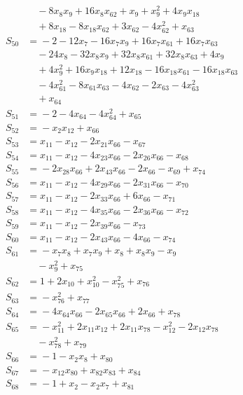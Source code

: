 \begin{align*}
&\quad{} -8x_{8}x_{9} +16x_{8}x_{62} +x_{9} +x_{9}^{2} +4x_{9}x_{18} \\
&\quad{} +8x_{18} -8x_{18}x_{62} +3x_{62} -4x_{62}^{2} +x_{63} \\
S_{50} &={} -2 -12x_{7} -16x_{7}x_{9} +16x_{7}x_{61} +16x_{7}x_{63} \\
&\quad{} -24x_{8} -32x_{8}x_{9} +32x_{8}x_{61} +32x_{8}x_{63} +4x_{9} \\
&\quad{} +4x_{9}^{2} +16x_{9}x_{18} +12x_{18} -16x_{18}x_{61} -16x_{18}x_{63} \\
&\quad{} -4x_{61}^{2} -8x_{61}x_{63} -4x_{62} -2x_{63} -4x_{63}^{2} \\
&\quad{} +x_{64} \\
S_{51} &={} -2 -4x_{64} -4x_{64}^{2} +x_{65} \\
S_{52} &={} -x_{2}x_{12} +x_{66} \\
S_{53} &={} x_{11} -x_{12} -2x_{21}x_{66} -x_{67} \\
S_{54} &={} x_{11} -x_{12} -4x_{23}x_{66} -2x_{26}x_{66} -x_{68} \\
S_{55} &={} -2x_{28}x_{66} +2x_{43}x_{66} -2x_{66} -x_{69} +x_{74} \\
S_{56} &={} x_{11} -x_{12} -4x_{29}x_{66} -2x_{31}x_{66} -x_{70} \\
S_{57} &={} x_{11} -x_{12} -2x_{33}x_{66} +6x_{66} -x_{71} \\
S_{58} &={} x_{11} -x_{12} -4x_{35}x_{66} -2x_{36}x_{66} -x_{72} \\
S_{59} &={} x_{11} -x_{12} -2x_{39}x_{66} -x_{73} \\
S_{60} &={} x_{11} -x_{12} -2x_{43}x_{66} -4x_{66} -x_{74} \\
S_{61} &={} -x_{7}x_{8} +x_{7}x_{9} +x_{8} +x_{8}x_{9} -x_{9} \\
&\quad{} -x_{9}^{2} +x_{75} \\
S_{62} &={} 1 +2x_{10} +x_{10}^{2} -x_{75}^{2} +x_{76} \\
S_{63} &={} -x_{76}^{2} +x_{77} \\
S_{64} &={} -4x_{64}x_{66} -2x_{65}x_{66} +2x_{66} +x_{78} \\
S_{65} &={} -x_{11}^{2} +2x_{11}x_{12} +2x_{11}x_{78} -x_{12}^{2} -2x_{12}x_{78} \\
&\quad{} -x_{78}^{2} +x_{79} \\
S_{66} &={} -1 -x_{2}x_{8} +x_{80} \\
S_{67} &={} -x_{12}x_{80} +x_{82}x_{83} +x_{84} \\
S_{68} &={} -1 +x_{2} -x_{2}x_{7} +x_{81} \\

\end{align*}
